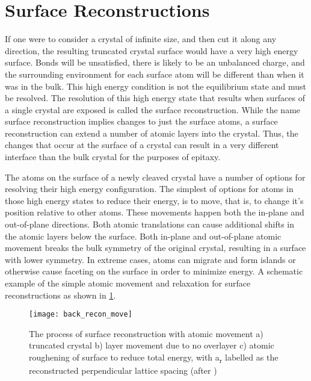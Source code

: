 \section{Surface Reconstructions}\label{sec:reconstruction}
If one were to consider a crystal of infinite size, and then cut it along any direction, the resulting truncated crystal surface would have a very high energy surface.
Bonds will be unsatisfied, there is likely to be an unbalanced charge, and the surrounding environment for each surface atom will be different than when it was in the bulk.
This high energy condition is not the equilibrium state and must be resolved.
The resolution of this high energy state that results when surfaces of a single crystal are exposed is called the surface reconstruction.
While the name surface reconstruction implies changes to just the surface atoms, a surface reconstruction can extend a number of atomic layers into the crystal.
Thus, the changes that occur at the surface of a crystal can result in a very different interface than the bulk crystal for the purposes of epitaxy.

The atoms on the surface of a newly cleaved crystal have a number of options for resolving their high energy configuration.
The simplest of options for atoms in those high energy states to reduce their energy, is to move, that is, to change it's position relative to other atoms.
These movements happen both the in-plane and out-of-plane directions.
Both atomic translations can cause additional shifts in the atomic layers below the surface.
Both in-plane and out-of-plane atomic movement breaks the bulk symmetry of the original crystal, resulting in a surface with lower symmetry.
In extreme cases, atoms can migrate and form islands or otherwise cause faceting on the surface in order to minimize energy\cite{Duke1996,oura2010surface}.
A schematic example of the simple atomic movement and relaxation for surface reconstructions as shown in \cref{fig:back_recon_move}.
\begin{figure}
 \centering \texttt{[image: back\_recon\_move]}
 \caption[Simple surface reconstruction]{\label{fig:back_recon_move}The process of surface reconstruction with atomic movement a) truncated crystal b) layer movement due to no overlayer c) atomic roughening of surface to reduce total energy, with a\textsubscript{r} labelled as the reconstructed perpendicular lattice spacing (after \cite{ohring2001materials})}
\end{figure}

